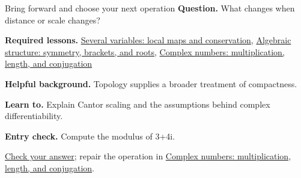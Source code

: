 \begin{learningcard}{Bring forward and choose your next operation}
\textsf{\textbf{Question.}} What changes when distance or scale changes?\par
\textbf{Required lessons.} \hyperref[learn:multivariable]{Several variables: local maps and conservation}, \hyperref[learn:algebra]{Algebraic structure: symmetry, brackets, and roots}, \hyperref[learn:complex_numbers]{Complex numbers: multiplication, length, and conjugation}\par
\textbf{Helpful background.} Topology supplies a broader treatment of compactness.\par
\textbf{Learn to.} Explain Cantor scaling and the assumptions behind complex differentiability.\par
\textbf{Entry check.} Compute the modulus of 3+4i.\par
\hyperref[solution:entry:geometry]{Check your answer}; repair the operation in \hyperref[learn:complex_numbers]{Complex numbers: multiplication, length, and conjugation}.
\end{learningcard}
